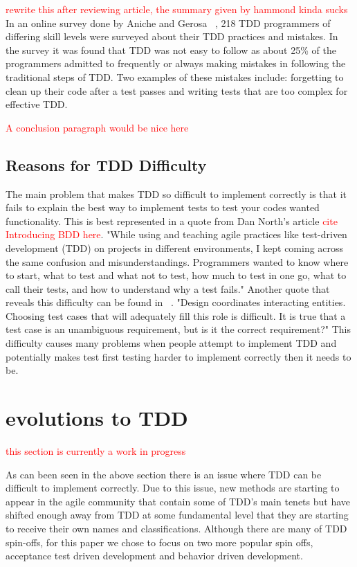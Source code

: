 \documentclass{sig-alternate}
\newcommand{\mycomment}[1]{\textcolor{red}{#1}}
\begin{document}
\mycomment{rewrite this after reviewing article, the summary given by hammond kinda sucks}
In an online survey done by Aniche and Gerosa ~\cite{Aniche:2010}, 218 TDD programmers of differing skill levels were surveyed about their TDD practices and mistakes.  In the survey it was found that TDD was not easy to follow as about 25\% of the programmers admitted to frequently or always making mistakes in following the traditional steps of TDD.  Two examples of these mistakes include: forgetting to clean up their code after a test passes and writing tests that are too complex for effective TDD.

\mycomment{A conclusion paragraph would be nice here}
\subsection{Reasons for TDD Difficulty}
The main problem that makes TDD so difficult to implement correctly is that it fails to explain the best way to implement tests to test your codes wanted functionality.  This is best represented in a quote from Dan North's article \mycomment{cite Introducing BDD here}.  "While using and teaching agile practices like test-driven development (TDD) on projects in different environments, I kept coming across the same confusion and misunderstandings. Programmers wanted to know where to start, what to test and what not to test, how much to test in one go, what to call their tests, and how to understand why a test fails."  Another quote that reveals this difficulty can be found in ~\cite{Hammond:2012}.  "Design coordinates interacting entities.  Choosing test cases that will adequately fill this role is difficult. It is true that a test case is an unambiguous requirement, but is it the correct requirement?"  This difficulty causes many problems when people attempt to implement TDD and potentially makes test first testing harder to implement correctly then it needs to be.

\section{evolutions to TDD}
\mycomment{this section is currently a work in progress}

As can been seen in the above section there is an issue where TDD can be difficult to implement correctly.  Due to this issue, new methods are starting to appear in the agile community that contain some of TDD's main tenets but have shifted enough away from TDD at some fundamental level that they are starting to receive their own names and classifications.  Although there are many of TDD spin-offs, for this paper we chose to focus on two more popular spin offs, acceptance test driven development and behavior driven development.
\end{document}
